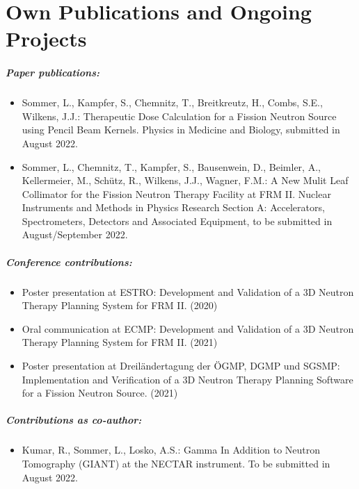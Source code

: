 \chapter*{Own Publications and Ongoing Projects}
\label{chapter:ownContribution}

\paragraph{Paper publications:}

\begin{itemize}
    \item Sommer, L., Kampfer, S., Chemnitz, T., Breitkreutz, H., Combs, S.E., Wilkens, J.J.: Therapeutic Dose Calculation for a Fission Neutron Source using Pencil Beam Kernels. Physics in Medicine and Biology, submitted in August 2022.
    \item Sommer, L., Chemnitz, T., Kampfer, S., Bausenwein, D., Beimler, A., Kellermeier, M., Sch\"utz, R., Wilkens, J.J., Wagner, F.M.: A New Mulit Leaf Collimator for the Fission Neutron Therapy Facility at FRM II. Nuclear Instruments and Methods in Physics Research Section A: Accelerators, Spectrometers, Detectors and Associated Equipment, to be submitted in August/September 2022.
\end{itemize}

\paragraph{Conference contributions:}
\begin{itemize}
    \item Poster presentation at ESTRO: Development and Validation of a 3D Neutron Therapy Planning System for FRM II. (2020)
\item Oral communication at ECMP: Development and Validation of a 3D Neutron Therapy Planning System for FRM II. (2021)
\item Poster presentation at Dreiländertagung der ÖGMP, DGMP und SGSMP: Implementation and Verification of a 3D Neutron Therapy Planning Software for a Fission Neutron Source. (2021)
\end{itemize}

\paragraph{Contributions as co-author:}
\begin{itemize}
    \item Kumar, R., Sommer, L., Losko, A.S.: Gamma In Addition to Neutron Tomography (GIANT) at the NECTAR instrument. To be submitted in August 2022.
\end{itemize}

